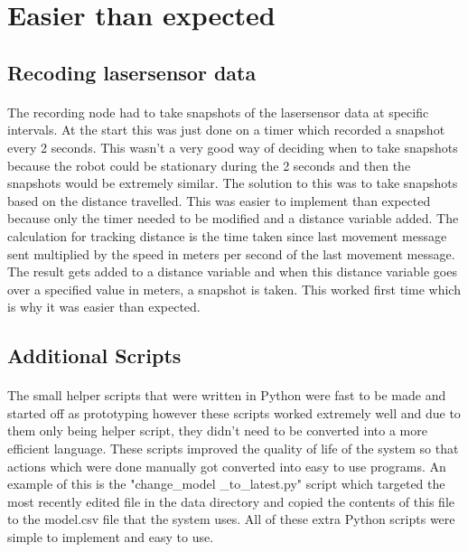 \section{Easier than expected}
\subsection{Recoding lasersensor data}
\paragraph{}
The recording node had to take snapshots of the lasersensor data at specific intervals. At the start this was just done on a timer which recorded a snapshot every 2 seconds. This wasn't a very good way of deciding when to take snapshots because the robot could be stationary during the 2 seconds and then the snapshots would be extremely similar. The solution to this was to take snapshots based on the distance travelled. This was easier to implement than expected because only the timer needed to be modified and a distance variable added. The calculation for tracking distance is the time taken since last movement message sent multiplied by the speed in meters per second of the last movement message. The result gets added to a distance variable and when this distance variable goes over a specified value in meters, a snapshot is taken. This worked first time which is why it was easier than expected.

\subsection{Additional Scripts}
\paragraph{}
The small helper scripts that were written in Python were fast to be made and started off as prototyping however these scripts worked extremely well and due to them only being helper script, they didn't need to be converted into a more efficient language. These scripts improved the quality of life of the system so that actions which were done manually got converted into easy to use programs. An example of this is the "change\_model \_to\_latest.py" script which targeted the most recently edited file in the data\/ directory and copied the contents of this file to the model.csv file that the system uses. All of these extra Python scripts were simple to implement and easy to use.

